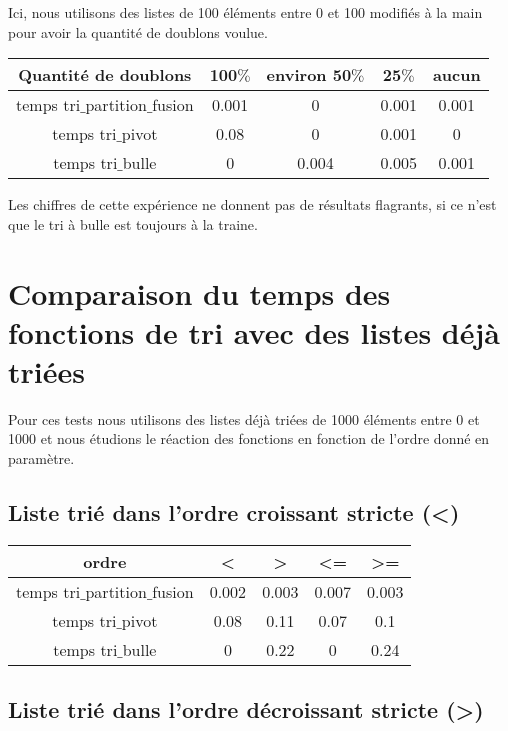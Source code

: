 \documentclass[a4paper, 12pt]{article}
\begin{document}
Ici, nous utilisons des listes de 100 éléments entre 0 et 100 modifiés à la main pour avoir la quantité de doublons voulue.
\begin{center}
\begin{tabular}{|c|c|c|c|c|}
\hline 
Quantité de doublons & 100$\%$ & environ 50$\%$ & 25$\%$ & aucun \\ 
\hline 
temps tri$\_$partition$\_$fusion & 0.001 & 0 &0.001 & 0.001 \\ 
\hline 
temps tri$\_$pivot & 0.08 & 0 & 0.001 & 0\\ 
\hline 
temps tri$\_$bulle & 0 & 0.004 & 0.005 & 0.001 \\ 
\hline  
\end{tabular}
\end{center} 

Les chiffres de cette expérience ne donnent pas de résultats flagrants, si ce n'est que le tri à bulle est toujours à la traine. 
  
\section{Comparaison du temps des fonctions de tri avec des listes déjà triées}

Pour ces tests nous utilisons des listes déjà triées de 1000 éléments entre 0 et 1000 et nous étudions le réaction des fonctions en fonction de l'ordre donné en paramètre.

\subsection{Liste trié dans l'ordre croissant stricte (<)}

\begin{center}
\begin{tabular}{|c|c|c|c|c|}
\hline 
ordre & < & > & <= & >= \\ 
\hline 
temps tri$\_$partition$\_$fusion & 0.002 & 0.003 &0.007 & 0.003 \\ 
\hline 
temps tri$\_$pivot & 0.08 & 0.11 & 0.07 & 0.1\\ 
\hline 
temps tri$\_$bulle & 0 & 0.22 & 0 & 0.24 \\ 
\hline  
\end{tabular}
\end{center} 

\subsection{Liste trié dans l'ordre décroissant stricte (>)}
\end{document}

